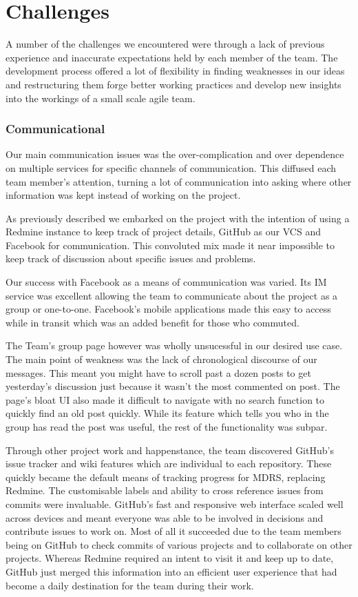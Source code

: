 \documentclass{l3proj}
\begin{document}
\chapter{Challenges}
\label{Challenges}

A number of the challenges we encountered were through a lack of previous
experience and inaccurate expectations held by each member of the team. The
development process offered a lot of flexibility in finding weaknesses in our
ideas and restructuring them forge better working practices and develop new
insights into the workings of a small scale agile team.

\subsection{Communicational}
Our main communication issues was the over-complication and over dependence on multiple services for specific channels of communication. This diffused each team member's attention, turning a lot of communication into asking where other information was kept instead of working on the project.

As previously described we embarked on the project with the intention of using a Redmine instance to keep track of project details, GitHub as our VCS and Facebook for communication. This convoluted mix made it near impossible to keep track of discussion about specific issues and problems.

Our success with Facebook as a means of communication was varied. Its IM service was excellent allowing the team to communicate about the project as a group or one-to-one. Facebook's mobile applications made this easy to access while in transit which was an added benefit for those who commuted.

The Team's group page however was wholly unsucessful in our desired use case. The main point of weakness was the lack of chronological discourse of our messages. This meant you might have to scroll past a dozen posts to get yesterday's discussion just because it wasn't the most commented on post. The page's bloat UI also made it difficult to navigate with no search function to quickly find an old post quickly. While its feature which tells you who in the group has read the post was useful, the rest of the functionality was subpar.

Through other project work and happenstance, the team discovered GitHub's issue
tracker and wiki features which are individual to each repository. These quickly
became the default means of tracking progress for MDRS, replacing Redmine. The
customisable labels and ability to cross reference issues from commits were
invaluable. GitHub's fast and responsive web interface scaled well across
devices and meant everyone was able to be involved in decisions and contribute
issues to work on. Most of all it succeeded due to the team members being on GitHub to check commits of various projects and to collaborate on other projects. Whereas Redmine required an intent to visit it and keep up to date, GitHub just merged this information into an efficient user experience that had become a daily destination for the team during their work.
\end{document}
